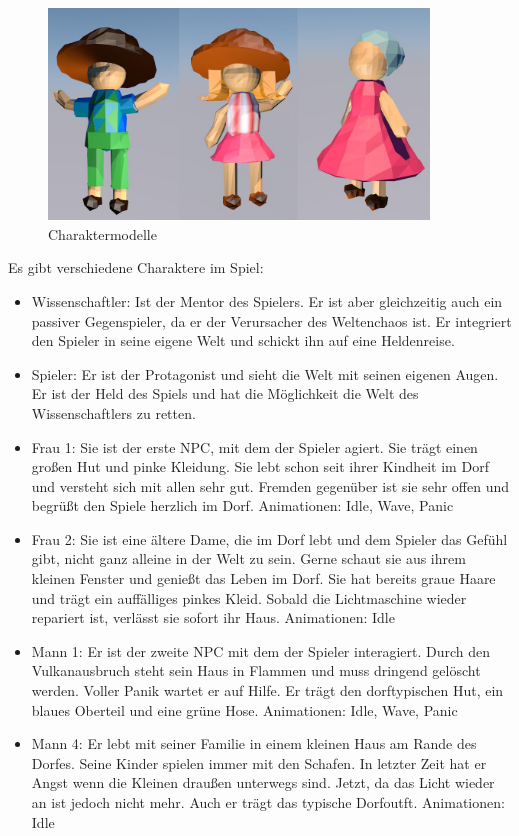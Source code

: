 
\begin{figure}[!htbp]%
	\centering
		\includegraphics[width=0.9\textwidth]{images/Charaktere}
	\caption{Charaktermodelle}
	\label{fig:Frau1}
\end{figure}

Es gibt verschiedene Charaktere im Spiel:

\begin{itemize}
\item Wissenschaftler: Ist der Mentor des Spielers. Er ist aber gleichzeitig auch ein passiver Gegenspieler, da er der Verursacher des Weltenchaos ist. Er integriert den Spieler in seine eigene Welt und schickt ihn auf eine Heldenreise.
\item Spieler: Er ist der Protagonist und sieht die Welt mit seinen eigenen Augen. Er ist der Held des Spiels und hat die Möglichkeit die Welt des Wissenschaftlers zu retten.
\item Frau 1: Sie ist der erste NPC, mit dem der Spieler agiert. Sie trägt einen großen Hut und pinke Kleidung. Sie lebt schon seit ihrer Kindheit im Dorf und versteht sich mit allen sehr gut. Fremden gegenüber ist sie sehr offen und begrüßt den Spiele herzlich im Dorf. Animationen: Idle, Wave, Panic
\item Frau 2: Sie ist eine ältere Dame, die im Dorf lebt und dem Spieler das Gefühl gibt, nicht ganz alleine in der Welt zu sein. Gerne schaut sie aus ihrem kleinen Fenster und genießt das Leben im Dorf. Sie hat bereits graue Haare und trägt ein auffälliges pinkes Kleid. Sobald die Lichtmaschine wieder repariert ist, verlässt sie sofort ihr Haus. Animationen: Idle
\item Mann 1: Er ist der zweite NPC mit dem der Spieler interagiert. Durch den Vulkanausbruch steht sein Haus in Flammen und muss dringend gelöscht werden. Voller Panik wartet er auf Hilfe. Er trägt den dorftypischen Hut, ein blaues Oberteil und eine grüne Hose. Animationen: Idle, Wave, Panic
\item Mann 4: Er lebt mit seiner Familie in einem kleinen Haus am Rande des Dorfes. Seine Kinder spielen immer mit den Schafen. In letzter Zeit hat er Angst wenn die Kleinen draußen unterwegs sind. Jetzt, da das Licht wieder an ist jedoch nicht mehr. Auch er trägt das typische Dorfoutft. Animationen: Idle
\end{itemize}